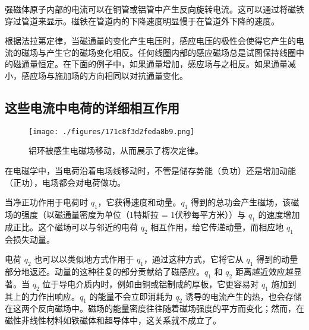 强磁体原子内部的电流可以在铜管或铝管中产生反向旋转电流。这可以通过将磁铁穿过管道来显示。磁铁在管道内的下降速度明显慢于在管道外下降的速度。

根据法拉第定律，当磁通量的变化产生电压时，感应电压的极性会使得它产生的电流的磁场与产生它的磁场变化相反。任何线圈内部的感应磁场总是试图保持线圈中的磁通量恒定。在下面的例子中，如果通量增加，感应场与之相反。如果通量减小，感应场与施加场的方向相同以对抗通量变化。

\subsection{这些电流中电荷的详细相互作用}

\begin{figure}[ht]
\centering
\texttt{[image: ./figures/171c8f3d2feda8b9.png]}
\caption{铝环被感生电磁场移动，从而展示了楞次定律。} \label{fig_LCDL_3}
\end{figure}

在电磁学中，当电荷沿着电场线移动时，不管是储存势能（负功）还是增加动能（正功），电场都会对电荷做功。

当净正功作用于电荷时 $ q_1 $，它获得速度和动量。$ q_1 $ 得到的总功会产生磁场，该磁场的强度（以磁通量密度为单位（1特斯拉 = 1伏秒每平方米））与 $ q_1 $ 的速度增加成正比。这个磁场可以与邻近的电荷 $ q_2 $ 相互作用，给它传递动量，而相应地 $ q_1 $ 会损失动量。


电荷 $ q_2 $  也可以以类似地方式作用于 $ q_1 $，通过这种方式，它将它从 $ q_1 $ 得到的动量部分地返还。动量的这种往复的部分贡献给了磁感应。$ q_1 $ 和 $ q_2 $  距离越近效应越显著。当 $ q_2 $  位于导电介质内时，例如由铜或铝制成的厚板，它更容易对 $q_1$ 施加到其上的力作出响应。$ q_1 $ 的能量不会立即消耗为 $ q_2 $  诱导的电流产生的热，也会存储在这两个反向磁场中。磁场的能量密度往往随着磁场强度的平方而变化；然而，在磁性非线性材料如铁磁体和超导体中，这关系就不成立了。
